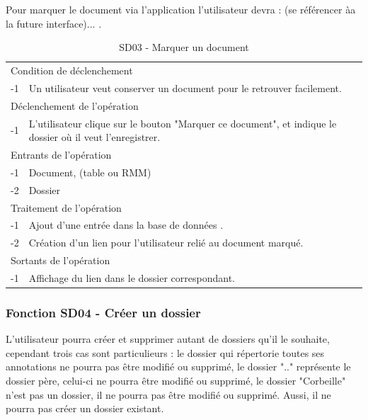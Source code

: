 \documentclass[a4paper]{article}
\begin{document}
Pour marquer le document via l'application l'utilisateur devra : (se référencer àa la future interface)... .\\

\begin{table}[H]
  \centering
   \small
	\begin{tabular}{|c|p{12cm}|}
   		\hline
   			\rowcolor{lightgray}\multicolumn{2}{|c|}{\textbf{SD03 - Marquer un document}} \\
   		\hline
   			\multicolumn{2}{|l|}{Condition de d\'eclenchement} \\
   		\hline
   		-1 & Un utilisateur veut conserver un document pour le retrouver facilement. \\
   		\hline
   			\multicolumn{2}{|l|}{D\'eclenchement de l'op\'eration} \\
   		\hline
   			-1 & L'utilisateur clique sur le bouton "Marquer ce document", et indique le dossier où il veut l'enregistrer. \\
   		\hline
   			\multicolumn{2}{|l|}{Entrants de l'op\'eration} \\
   		\hline
   			-1 & Document, (table ou RMM)\\
        		-2 & Dossier\\
   		\hline
   			\multicolumn{2}{|l|}{Traitement de l'op\'eration} \\
  		\hline
   			-1 & Ajout d'une entr\'ee dans la base de donn\'ees .\\
			-2 & Création d'un lien pour l'utilisateur relié au document marqué.\\
   		\hline
   			\multicolumn{2}{|l|}{Sortants de l'op\'eration} \\
   		\hline
   			-1 & Affichage du lien dans le dossier correspondant. \\
   		\hline
	\end{tabular}
  \caption{SD03 - Marquer un document}
  \normalsize
  \label{tab:marquer_document}
\end{table}

\subsubsection{Fonction SD04 - Créer un dossier}
L'utilisateur pourra créer et supprimer autant de dossiers qu'il le souhaite, cependant trois cas sont particulieurs : le dossier qui répertorie toutes ses annotations ne pourra pas être modifié ou supprimé, le dossier ".." représente le dossier père, celui-ci ne pourra être modifié ou supprimé, le dossier "Corbeille" n'est pas un dossier, il ne pourra pas être modifié ou supprimé. Aussi, il ne pourra pas créer un dossier existant.
\end{document}
